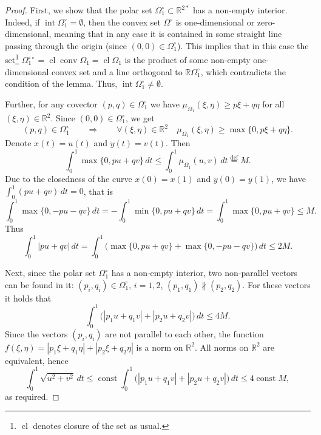 \documentclass[a4paper,12pt]{article}
\DeclareMathOperator{\const}{const}
\newcommand{\eqdef}{\stackrel{\mathrm{def}}{=}}
\newcommand {\R}{{\mathbb R}}
\theoremstyle{remark}
\theoremstyle{definition}
\begin{document}
\begin{proof}
	
	First, we show that the polar set $\Omega_1^\circ\subset\R^{2*}$ has a non-empty interior. Indeed, if $\operatorname{int}\Omega_1^\circ=\emptyset$, then the convex set $\Omega^\circ$ is one-dimensional or zero-dimensional, meaning that in any case it is contained in some straight line passing through the origin (since $(0,0)\in\Omega_1^\circ$). This implies that in this case the set\footnote{$\operatorname{cl}$ denotes closure of the set as usual.} $\Omega_1^{\circ\circ}=\operatorname{cl}\operatorname{conv}\Omega_1=\operatorname{cl}\Omega_1$ is the product of some non-empty one-dimensional convex set and a line orthogonal to $\R\Omega_1^\circ$, which contradicts the condition of the lemma. Thus, $\operatorname{int}\Omega_1^\circ\ne\emptyset$.
	
	Further, for any covector $(p,q)\in\Omega_1^\circ$ we have $\mu_{\Omega_1}(\xi,\eta)\ge p\xi+q\eta$ for all $(\xi,\eta)\in\R^2$. Since $(0,0)\in\Omega_1^\circ$, we get
	$$
	(p,q)\in\Omega_1^\circ
	\qquad\Longrightarrow\qquad
	\forall (\xi,\eta)\in\R^2\quad \mu_{\Omega_1}(\xi,\eta)\ge\max\{0,p\xi+q\eta\}.
	$$
	Denote $\dot x(t)=u(t)$ and $\dot y(t)=v(t)$. Then
	$$
	\int_0^1 \max\{0,pu+qv\}\,dt \le \int_0^1\mu_{\Omega_1}(u,v)\,dt \eqdef M.
	$$
	Due to the closedness of the curve $x(0)=x(1)$ and $y(0)=y(1)$, we have $\int_0^1 (pu+qv)\,dt=0$, that is
	$$
	\int_0^1 \max\{0,-pu-qv\}\,dt = -\int_0^1\min\{0,pu+qv\}\,dt =
	\int_0^1\max\{0,pu+qv\} \le M.
	$$
	Thus
	$$
	\int_0^1 |pu+qv|\,dt = \int_0^1 \big(\max\{0,pu+qv\} + \max\{0,-pu-qv\}\big) \,dt \le 2M.
	$$
	
	Next, since the polar set $\Omega_1^\circ$ has a non-empty interior, two non-parallel vectors can be found in it: $(p_i,q_i)\in\Omega_1^\circ$, $i=1,2$, $(p_1,q_1)\nparallel(p_2,q_2)$. For these vectors it holds that
	$$
	\int_0^1 \big(|p_1u+q_1v| + |p_2u+q_2v|\big)\,dt \le 4M.
	$$
	Since the vectors $(p_i,q_i)$ are not parallel to each other, the function $f(\xi,\eta)=|p_1\xi+q_1\eta| + |p_2\xi+q_2\eta|$ is a norm on $\R^2$. All norms on $\R^2$ are equivalent, hence
	$$
	\int_0^1\sqrt{u^2+v^2}\,dt \le \const \int_0^1 \big(|p_1u+q_1v| + |p_2u+q_2v|\big)\,dt \le 4\const M,
	$$
	as required.
\end{proof}
\end{document}
